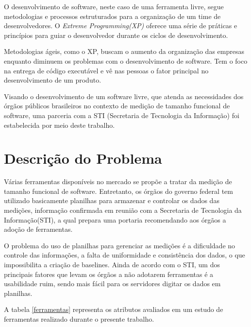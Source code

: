 O desenvolvimento de software, neste caso de uma ferramenta livre, segue metodologias e processos estruturados para a organização de um time de desenvolvedores. O \textit{Extreme Programming(XP)} oferece uma série de práticas e princípios para guiar o desenvolvedor durante os ciclos de desenvolvimento.

Metodologias ágeis, como o XP, buscam o aumento da organização das empresas enquanto diminuem os problemas com o desenvolvimento de software. Tem o foco na entrega de código executável e vê nas pessoas o fator principal no desenvolvimento de um produto. \cite{Maurer:2002}

Visando o desenvolvimento de um software livre, que atenda as necessidades dos órgãos públicos brasileiros no contexto de medição de tamanho funcional de software, uma parceria com a STI (Secretaria de Tecnologia da Informação) foi estabelecida por meio deste trabalho.

\section{Descrição do Problema}

Várias ferramentas disponíveis no mercado se propõe a tratar da medição de tamanho funcional de software. Entretanto, os órgãos do governo federal tem utilizado basicamente planilhas para armazenar e controlar os dados das medições, informação confirmada em reunião com a Secretaria de Tecnologia da Informação(STI), a qual prepara uma portaria recomendando aos órgãos a adoção de ferramentas.

O problema do uso de planilhas para gerenciar as medições é a dificuldade no controle das informações, a falta de uniformidade e consistência dos dados, o que impossibilita a criação de baselines. Ainda de acordo com o STI, um dos principais fatores que levam os órgãos a não adotarem ferramentas é a usabilidade ruim, sendo mais fácil para os servidores digitar os dados em planilhas.

A tabela \ref{ferramentas} representa os atributos avaliados em um estudo de ferramentas realizado durante o presente trabalho.

